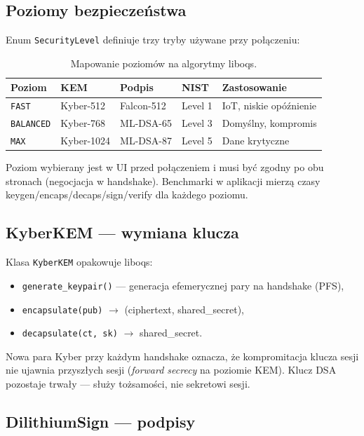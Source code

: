\documentclass[12pt,a4paper]{article}
\begin{document}
\subsection{Poziomy bezpieczeństwa}

Enum \texttt{SecurityLevel} definiuje trzy tryby używane przy połączeniu:

\begin{table}[H]
\centering
\begin{tabular}{@{}llllp{3.5cm}@{}}
\toprule
\textbf{Poziom} & \textbf{KEM} & \textbf{Podpis} & \textbf{NIST} & \textbf{Zastosowanie} \\
\midrule
\texttt{FAST} & Kyber-512 & Falcon-512 & Level 1 & IoT, niskie opóźnienie \\
\texttt{BALANCED} & Kyber-768 & ML-DSA-65 & Level 3 & Domyślny, kompromis \\
\texttt{MAX} & Kyber-1024 & ML-DSA-87 & Level 5 & Dane krytyczne \\
\bottomrule
\end{tabular}
\caption{Mapowanie poziomów na algorytmy liboqs.}
\end{table}

Poziom wybierany jest w UI przed połączeniem i musi być zgodny po obu stronach (negocjacja w handshake). Benchmarki w aplikacji mierzą czasy keygen/encaps/decaps/sign/verify dla każdego poziomu.

\subsection{KyberKEM --- wymiana klucza}

Klasa \texttt{KyberKEM} opakowuje liboqs:
\begin{itemize}
    \item \texttt{generate\_keypair()} --- generacja efemerycznej pary na handshake (PFS),
    \item \texttt{encapsulate(pub)} $\rightarrow$ (ciphertext, shared\_secret),
    \item \texttt{decapsulate(ct, sk)} $\rightarrow$ shared\_secret.
\end{itemize}

Nowa para Kyber przy każdym handshake oznacza, że kompromitacja klucza sesji nie ujawnia przyszłych sesji (\emph{forward secrecy} na poziomie KEM). Klucz DSA pozostaje trwały --- służy tożsamości, nie sekretowi sesji.

\subsection{DilithiumSign --- podpisy}
\end{document}

